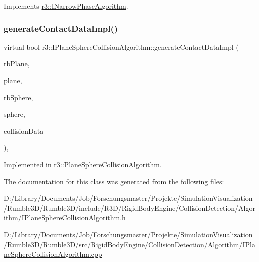 Implements \mbox{\hyperlink{classr3_1_1_i_narrow_phase_algorithm_a606fe8de5fe81ff45fedb81ca74717c3}{r3\+::\+I\+Narrow\+Phase\+Algorithm}}.

\mbox{\label{classr3_1_1_i_plane_sphere_collision_algorithm_a92ddfd3ba00ed53b183a6aef41b04a60}} 
\subsubsection{\texorpdfstring{generate\+Contact\+Data\+Impl()}{generateContactDataImpl()}}
{\footnotesize\ttfamily virtual bool r3\+::\+I\+Plane\+Sphere\+Collision\+Algorithm\+::generate\+Contact\+Data\+Impl (\begin{DoxyParamCaption}\item[{\mbox{\hyperlink{classr3_1_1_rigid_body}{Rigid\+Body}} $\ast$}]{rb\+Plane,  }\item[{\mbox{\hyperlink{classr3_1_1_collision_plane}{Collision\+Plane}} $\ast$}]{plane,  }\item[{\mbox{\hyperlink{classr3_1_1_rigid_body}{Rigid\+Body}} $\ast$}]{rb\+Sphere,  }\item[{\mbox{\hyperlink{classr3_1_1_collision_sphere}{Collision\+Sphere}} $\ast$}]{sphere,  }\item[{\mbox{\hyperlink{classr3_1_1_collision_data}{Collision\+Data}} \&}]{collision\+Data }\end{DoxyParamCaption})\hspace{0.3cm}{\ttfamily [protected]}, {}}



Implemented in \mbox{\hyperlink{classr3_1_1_plane_sphere_collision_algorithm_a6823dc80b23ce77beabd26a9c2a9d9ed}{r3\+::\+Plane\+Sphere\+Collision\+Algorithm}}.



The documentation for this class was generated from the following files\+:\begin{DoxyCompactItemize}
\item 
D\+:/\+Library/\+Documents/\+Job/\+Forschungsmaster/\+Projekte/\+Simulation\+Visualization/\+Rumble3\+D/\+Rumble3\+D/include/\+R3\+D/\+Rigid\+Body\+Engine/\+Collision\+Detection/\+Algorithm/\mbox{\hyperlink{_i_plane_sphere_collision_algorithm_8h}{I\+Plane\+Sphere\+Collision\+Algorithm.\+h}}\item 
D\+:/\+Library/\+Documents/\+Job/\+Forschungsmaster/\+Projekte/\+Simulation\+Visualization/\+Rumble3\+D/\+Rumble3\+D/src/\+Rigid\+Body\+Engine/\+Collision\+Detection/\+Algorithm/\mbox{\hyperlink{_i_plane_sphere_collision_algorithm_8cpp}{I\+Plane\+Sphere\+Collision\+Algorithm.\+cpp}}\end{DoxyCompactItemize}
